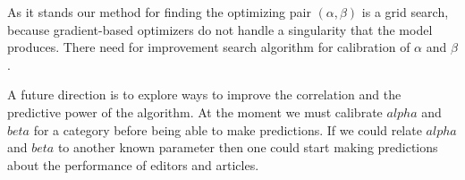 As it stands our method for finding the optimizing pair $(\alpha,\beta)$ is a grid search, because gradient-based optimizers do not handle a singularity that the model produces. There need for improvement search algorithm for calibration of $\alpha$ and $\beta$.


A future direction is to explore ways to improve the correlation and the predictive power of the algorithm. At the moment we must calibrate $alpha$ and $beta$ for a category before being able to make predictions. If we could relate $alpha$ and $beta$ to another known parameter then one could start making predictions about the performance of editors and articles.


